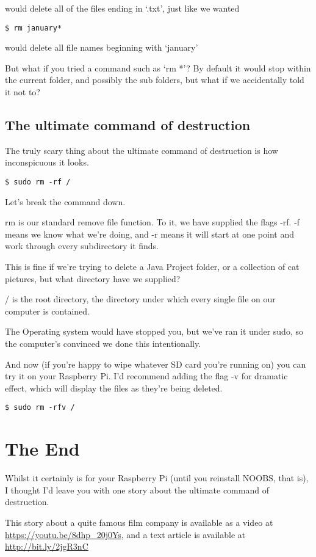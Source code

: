 		would delete all of the files ending in `.txt', just like we wanted
\begin{lstlisting}
$ rm january*
\end{lstlisting}

		would delete all file names beginning with `january'
	
		But what if you tried a command such as `rm *'? By default it would stop within the current folder, and possibly the sub folders, but what if we accidentally told it not to?
	
	\subsection{The ultimate command of destruction}
	
	The truly scary thing about the ultimate command of destruction is how inconspicuous it looks.
	
\begin{lstlisting}
$ sudo rm -rf /
\end{lstlisting}

	Let's break the command down.
	
	rm is our standard remove file function. To it, we have supplied the flags -rf. -f means we know what we're doing, and -r means it will start at one point and work through every subdirectory it finds.
	
	This is fine if we're trying to delete a Java Project folder, or a collection of cat pictures, but what directory have we supplied?
	
	/ is the root directory, the directory under which every single file on our computer is contained.
	
	The Operating system would have stopped you, but we've ran it under sudo, so the computer's convinced we done this intentionally.
	
	And now (if you're happy to wipe whatever SD card you're running on) you can try it on your Raspberry Pi. I'd recommend adding the flag -v for dramatic effect, which will display the files as they're being deleted.
	
\begin{lstlisting}
$ sudo rm -rfv /
\end{lstlisting}

\section{The End}

	Whilst it certainly is for your Raspberry Pi (until you reinstall NOOBS, that is), I thought I'd leave you with one story about the ultimate command of destruction.
	
	This story about a quite famous film company is available as a video at \url{https://youtu.be/8dhp_20j0Ys}, and a text article is available at \url{http://bit.ly/2jgR3nC}